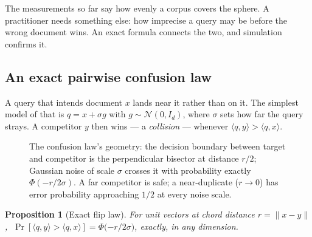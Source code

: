 \documentclass[11pt,letterpaper]{article}
\newtheorem{proposition}{Proposition}
\begin{document}
The measurements so far say how evenly a corpus covers the sphere. A
practitioner needs something else: how imprecise a query may be before
the wrong document wins. An exact formula connects the two, and
simulation confirms it.

\subsection{An exact pairwise confusion law}

A query that intends document $x$ lands near it rather than on it. The
simplest model of that is $q = x + \sigma g$ with $g \sim \mathcal N(0,
I_d)$, where $\sigma$ sets how far the query strays. A competitor $y$
then wins --- a \emph{collision} --- whenever $\langle q, y\rangle >
\langle q, x\rangle$.

\begin{figure}[t]
\centering
{}
\caption{The confusion law's geometry: the decision boundary between target
and competitor is the perpendicular bisector at distance $r/2$; Gaussian
noise of scale $\sigma$ crosses it with probability exactly
$\Phi(-r/2\sigma)$. A far competitor is safe; a near-duplicate ($r \to 0$)
has error probability approaching $1/2$ at every noise scale.}
\label{fig:bisector}
\end{figure}

\begin{proposition}[Exact flip law]\label{prop:flip}
For unit vectors at chord distance $r = \lVert x - y \rVert$,
$\;\Pr[\langle q, y\rangle > \langle q, x\rangle] =
\Phi\!\big({-r}/{2\sigma}\big)$, exactly, in any dimension.
\end{proposition}
\end{document}
